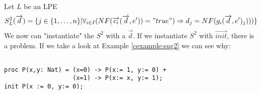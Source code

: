 \index{}\documentclass[a4paper,10pt]{article}
\theoremstyle{plain}
\theoremstyle{definition}
\newcommand{\ovr}{\overrightarrow}
\begin{document}
\begin{defn} Let $L$ be an LPE\label{def:sug2} 
\begin{displaymath}
S_L^2(\ovr{d})=
\lbrace   
j \in \lbrace 1, \ldots , n \rbrace \vert \forall_{i\in I} (NF(\ovr{c_i}(\ovr{d},e')) = "true") \Rightarrow d_j = NF(g_i(\ovr{d},e')_j)))\rbrace
\end{displaymath}
We now can "instantiate" the $S^2$ with a $\ovr{d}$. If we instantiate $S^2$ with $\ovr{init}$, there is a problem. If we take a look at Example \ref{cexample:sug2} we can see why:
\begin{example} [Let $E2$ be]\label{cexample:sug2}\begin{verbatim} 
 
proc P(x,y: Nat) = (x=0) -> P(x:= 1, y:= 0) +
                   (x=1) -> P(x:= x, y:= 1);
init P(x := 0, y:= 0);


\end{verbatim}
\end{example}
\end{defn}
\end{document}
